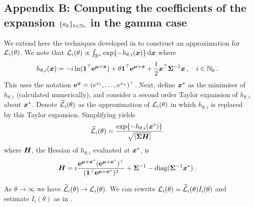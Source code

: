 \begin{subappendices}
\section*{Appendix B: Computing the coefficients of the expansion $\{a_{k}\}_{k\in\mathbb{N}_0}$
in the gamma case} \label{app:proof}



We extend here the techniques developed in \cite{La15} to construct an approximation
for $\mathcal{L}_i(\theta)$. We note that $\Laplace_i(\theta) \propto \int_{\RL^n} \exp\{ -h_{\theta,i}(\bfx) \} \dif \bfx $ where
\[ h_{\theta,i}(\bm{x}) = - i \ln(\bm{1}^\top \bm{\mathrm{e}}^{\bm{\mu} + \bm{x}}) + \theta \bm{1}^\top \bm{\mathrm{e}}^{\bm{\mu} + \bm{x}} + \frac12 \bm{x}^\top \bm{\Sigma}^{-1} \bm{x} \,, \quad i \in \mathbb{N}_0 \,. \]
This uses the notation $\bm{\mathrm{e}}^{\bm{x}} = (\mathrm{e}^{x_1}, \dots, \mathrm{e}^{x_n})^\top$. Next, define $\bm{x}^*$ as the minimiser of $h_{\theta,i}$ (calculated numerically), and consider a second order Taylor expansion of $h_{\theta,i}$ about $\bm{x}^*$. Denote $\widetilde{\mathcal{L}}_i(\theta)$ as the approximation of $\mathcal{L}_i(\theta)$ in which $h_{\theta,i}$ is replaced by this Taylor expansion. Simplifying yields
\begin{equation} \label{firstTerm}
	\widetilde{\mathcal{L}}_i(\theta) = \frac{\exp\{-h_{\theta,i}(\bm{x}^*)\}}{\sqrt{|\bm{\Sigma} \bm{H}|}}
\end{equation}
where $\bm{H}$, the Hessian of $h_{\theta,i}$ evaluated at $\bm{x}^*$, is
\[ \bm{H} = i\frac{\bm{\mathrm{e}}^{\bm{\mu} + \bm{x}^*} (\bm{\mathrm{e}}^{\bm{\mu} + \bm{x}^*})^\top}{(\bm{1}^\top \bm{\mathrm{e}}^{\bm{\mu} + \bm{x}^*})^2} + \bm{\Sigma}^{-1} - \mathrm{diag}(\bm{\Sigma}^{-1} \bm{x}^*) \,. \]

As $\theta \to \infty$ we have $\widetilde{\mathcal{L}}_i(\theta) \to \mathcal{L}_i(\theta)$. We can rewrite $\mathcal{L}_i(\theta) = \widetilde{\mathcal{L}}_i(\theta) I_i(\theta)$ and estimate $I_i(\theta)$ as in \cite{La15}.


\end{subappendices}
